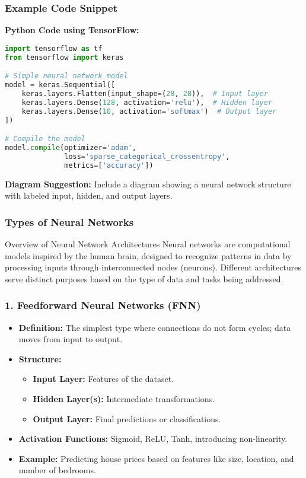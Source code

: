 \documentclass[aspectratio=169]{beamer}
\begin{document}
\begin{frame}[fragile]
    \frametitle{Example Code Snippet}
    
    \textbf{Python Code using TensorFlow:}

    \begin{lstlisting}[language=Python]
import tensorflow as tf
from tensorflow import keras

# Simple neural network model
model = keras.Sequential([
    keras.layers.Flatten(input_shape=(28, 28)),  # Input layer
    keras.layers.Dense(128, activation='relu'),  # Hidden layer
    keras.layers.Dense(10, activation='softmax')  # Output layer
])

# Compile the model
model.compile(optimizer='adam',
              loss='sparse_categorical_crossentropy',
              metrics=['accuracy'])
    \end{lstlisting}
    
    \textbf{Diagram Suggestion:} Include a diagram showing a neural network structure with labeled input, hidden, and output layers.
\end{frame}

\begin{frame}[fragile]
    \frametitle{Types of Neural Networks}
    \begin{block}{Overview of Neural Network Architectures}
        Neural networks are computational models inspired by the human brain, designed to recognize patterns in data by processing inputs through interconnected nodes (neurons). Different architectures serve distinct purposes based on the type of data and tasks being addressed.
    \end{block}
\end{frame}

\begin{frame}[fragile]
    \frametitle{1. Feedforward Neural Networks (FNN)}
    \begin{itemize}
        \item \textbf{Definition:} The simplest type where connections do not form cycles; data moves from input to output.
        \item \textbf{Structure:}
            \begin{itemize}
                \item \textbf{Input Layer:} Features of the dataset.
                \item \textbf{Hidden Layer(s):} Intermediate transformations.
                \item \textbf{Output Layer:} Final predictions or classifications.
            \end{itemize}
        \item \textbf{Activation Functions:} Sigmoid, ReLU, Tanh, introducing non-linearity.
        \item \textbf{Example:} Predicting house prices based on features like size, location, and number of bedrooms.
    \end{itemize}
\end{frame}
\end{document}
